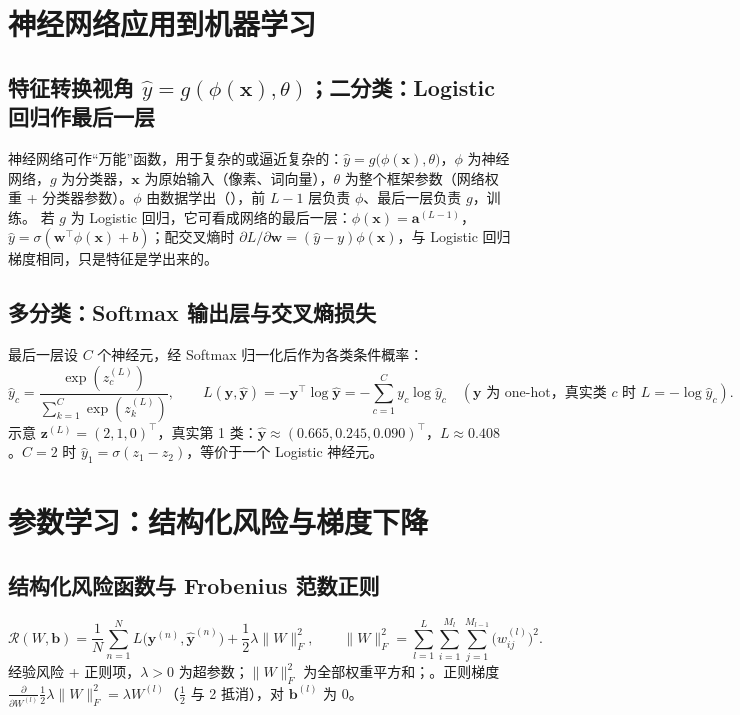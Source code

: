 \section{神经网络应用到机器学习}

\subsection{特征转换视角 \texorpdfstring{$\hat y=g(\phi(\bm x),\theta)$}{y=g(phi(x),theta)}；二分类：Logistic 回归作最后一层}
神经网络可作“万能”函数，用于复杂的或逼近复杂的：$\hat y=g\big(\phi(\bm x),\theta\big)$，$\phi$ 为神经网络，$g$ 为分类器，$\bm x$ 为原始输入（像素、词向量），$\theta$ 为整个框架参数（网络权重 + 分类器参数）。$\phi$ 由数据学出（），前 $L-1$ 层负责 $\phi$、最后一层负责 $g$，训练。
若 $g$ 为 Logistic 回归，它可看成网络的最后一层：$\phi(\bm x)=\bm a^{(L-1)}$，$\hat y=\sigma(\bm w^\top\phi(\bm x)+b)$；配交叉熵时 $\partial L/\partial\bm w=(\hat y-y)\phi(\bm x)$，与 Logistic 回归梯度相同，只是特征是学出来的。

\subsection{多分类：Softmax 输出层与交叉熵损失}
最后一层设 $C$ 个神经元，经 Softmax 归一化后作为各类条件概率：
\[
\hat y_c=\frac{\exp(z^{(L)}_c)}{\sum_{k=1}^C\exp(z^{(L)}_k)},\qquad L(\bm y,\hat{\bm y})=-\bm y^\top\log\hat{\bm y}=-\sum_{c=1}^Cy_c\log\hat y_c\quad(\bm y\text{ 为 one-hot，真实类 }c\text{ 时 }L=-\log\hat y_c).
\]
示意 $\bm z^{(L)}=(2,1,0)^\top$，真实第 1 类：$\hat{\bm y}\approx(0.665,0.245,0.090)^\top$，$L\approx0.408$。$C=2$ 时 $\hat y_1=\sigma(z_1-z_2)$，等价于一个 Logistic 神经元。

\section{参数学习：结构化风险与梯度下降}

\subsection{结构化风险函数与 Frobenius 范数正则}
\[
\mathcal R(W,\bm b)=\frac1N\sum_{n=1}^N L\big(\bm y^{(n)},\hat{\bm y}^{(n)}\big)+\frac12\lambda\|W\|_F^2,\qquad \|W\|_F^2=\sum_{l=1}^L\sum_{i=1}^{M_l}\sum_{j=1}^{M_{l-1}}\big(w^{(l)}_{ij}\big)^2 .
\]
经验风险 + 正则项，$\lambda>0$ 为超参数；$\|W\|_F^2$ 为全部权重平方和；。正则梯度 $\frac{\partial}{\partial W^{(l)}}\frac12\lambda\|W\|_F^2=\lambda W^{(l)}$（$\frac12$ 与 2 抵消），对 $\bm b^{(l)}$ 为 0。

